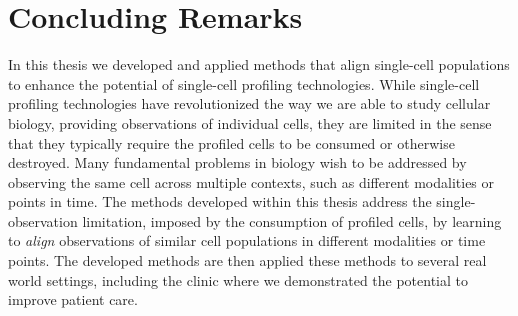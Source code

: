 
\chapter{Concluding Remarks}

In this thesis we developed and applied methods that align single-cell populations to enhance the potential of single-cell profiling technologies.
While single-cell profiling technologies have revolutionized the way we are able to study cellular biology, providing observations of individual cells,
they are limited in the sense that they typically require the profiled cells to be consumed or otherwise destroyed.
Many fundamental problems in biology wish to be addressed by observing the same cell across multiple contexts, such as different modalities or points in time.
The methods developed within this thesis address the single-observation limitation, imposed by the consumption of profiled cells,
by learning to \emph{align} observations of similar cell populations in different modalities or time points.
The developed methods are then applied these methods to several real world settings,
including the clinic where we demonstrated the potential to improve patient care.

